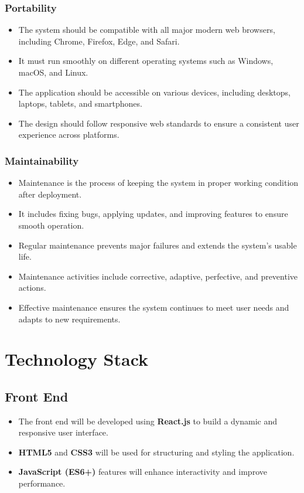 \documentclass[12pt]{article}
\begin{document}
	\subsubsection{Portability}
	\begin{itemize}
		\item The system should be compatible with all major modern web browsers, including Chrome, Firefox, Edge, and Safari.
		\item It must run smoothly on different operating systems such as Windows, macOS, and Linux.
		\item The application should be accessible on various devices, including desktops, laptops, tablets, and smartphones.
		\item The design should follow responsive web standards to ensure a consistent user experience across platforms.
	\end{itemize}
	
	\subsubsection{Maintainability}
	\begin{itemize}
		\item Maintenance is the process of keeping the system in proper working condition after deployment.
		\item It includes fixing bugs, applying updates, and improving features to ensure smooth operation.
		\item Regular maintenance prevents major failures and extends the system’s usable life.
		\item Maintenance activities include corrective, adaptive, perfective, and preventive actions.
		\item Effective maintenance ensures the system continues to meet user needs and adapts to new requirements.
	\end{itemize}
	
	
	\section{Technology Stack}
	
	\subsection{Front End}
	\begin{itemize}
		\item The front end will be developed using \textbf{React.js} to build a dynamic and responsive user interface.
		\item \textbf{HTML5} and \textbf{CSS3} will be used for structuring and styling the application.
		\item \textbf{JavaScript (ES6+)} features will enhance interactivity and improve performance.
	\end{itemize}
	
\end{document}

